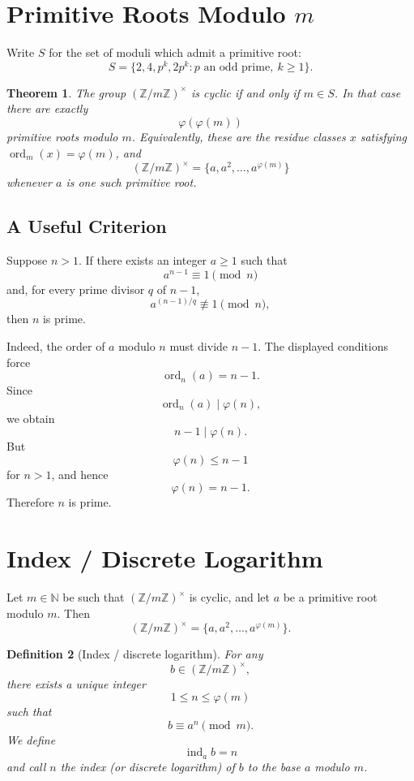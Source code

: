 \documentclass[11pt]{article}
\newtheorem{theorem}{Theorem}[section]
\newtheorem{definition}[theorem]{Definition}
\theoremstyle{remark}
\DeclareMathOperator{\ord}{ord}
\DeclareMathOperator{\ind}{ind}
\newcommand{\N}{\mathbb N}
\newcommand{\phiE}{\varphi}
\newcommand{\units}[1]{\left(\mathbb Z/#1\mathbb Z\right)^\times}
\begin{document}
\section{Primitive Roots Modulo $m$}

Write $S$ for the set of moduli which admit a primitive root:
\[
    S=\{2,4,p^k,2p^k:p\text{ an odd prime},\ k\ge 1\}.
\]

\begin{theorem}
The group $\units m$ is cyclic if and only if $m\in S$. In that case there
are exactly
\[
    \boxed{\phiE(\phiE(m))}
\]
primitive roots modulo $m$. Equivalently, these are the residue classes $x$
satisfying $\ord_m(x)=\phiE(m)$, and
\[
    \units m=\{a,a^2,\ldots,a^{\phiE(m)}\}
\]
whenever $a$ is one such primitive root.
\end{theorem}

\subsection{A Useful Criterion}

Suppose $n>1$. If there exists an integer $a\ge1$ such that
\[
    a^{n-1}\equiv1\pmod n
\]
and, for every prime divisor $q$ of $n-1$,
\[
    a^{(n-1)/q}\not\equiv1\pmod n,
\]
then $n$ is prime.

Indeed, the order of $a$ modulo $n$ must divide $n-1$. The displayed
conditions force
\[
    \ord_n(a)=n-1.
\]
Since
\[
    \ord_n(a)\mid\phiE(n),
\]
we obtain
\[
    n-1\mid\phiE(n).
\]
But
\[
    \phiE(n)\le n-1
\]
for $n>1$, and hence
\[
    \phiE(n)=n-1.
\]
Therefore $n$ is prime.

\section{Index / Discrete Logarithm}

Let $m\in\N$ be such that $\units m$ is cyclic, and let $a$ be a
primitive root modulo $m$. Then
\[
    \units m
    =
    \{a,a^2,\ldots,a^{\phiE(m)}\}.
\]

\begin{definition}[Index / discrete logarithm]
For any
\[
    b\in\units m,
\]
there exists a unique integer
\[
    1\le n\le\phiE(m)
\]
such that
\[
    b\equiv a^n\pmod m.
\]
We define
\[
    \boxed{\ind_a b=n}
\]
and call $n$ the \emph{index} (or discrete logarithm) of $b$ to the base
$a$ modulo $m$.
\end{definition}
\end{document}
